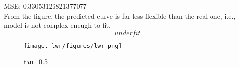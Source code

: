 \begin{answer}
MSE: 0.33053126821377077\\
From the figure, the predicted curve is far less flexible than the real one, i.e., model is not complex enough to fit.
\[\boxed{underfit}\]
\begin{figure}[htbp]
  \centering
  \texttt{[image: lwr/figures/lwr.png]}
  \caption{tau=0.5 }
  \label{fig:lwr}
\end{figure}
\end{answer}
